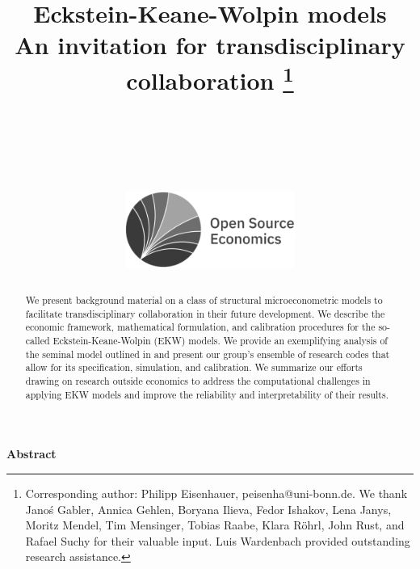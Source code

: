 
\title{Eckstein-Keane-Wolpin models\\
	\large An invitation for transdisciplinary collaboration \thanks{Corresponding author: Philipp Eisenhauer, peisenha@uni-bonn.de. We thank  Jano\'s Gabler, Annica Gehlen, Boryana Ilieva, Fedor Ishakov, Lena Janys, Moritz Mendel, Tim Mensinger, Tobias Raabe, Klara R\"ohrl, John Rust, and Rafael Suchy for their valuable input. Luis Wardenbach provided outstanding research assistance.} \\
	\\
	\\
	\\
	\includegraphics[height=2.5cm]{../material/crop-ose-logo-black-white.pdf}
}

\renewcommand{\thefootnote}{\fnsymbol{footnote}}


\vspace{2.5cm}
\renewcommand{\baselinestretch}{1.3}\normalsize

\setcounter{page}{1}
\thispagestyle{empty}

\begin{center}\textbf{Abstract}\end{center}
\begin{abstract}
\noindent We  present background material on a class of structural microeconometric models to facilitate transdisciplinary collaboration in their future development. We describe the economic framework, mathematical formulation, and calibration procedures for the so-called Eckstein-Keane-Wolpin (EKW) models. We provide an exemplifying analysis of the seminal model outlined in \citet{Keane.1997} and present our group's ensemble of research codes that allow for its specification, simulation, and calibration. We summarize our efforts drawing on research outside economics to
address the computational challenges in applying EKW models and improve the reliability and interpretability of their results.
\end{abstract}



\setcounter{page}{1}
\thispagestyle{empty}

\newpage
\tableofcontents
\newpage
